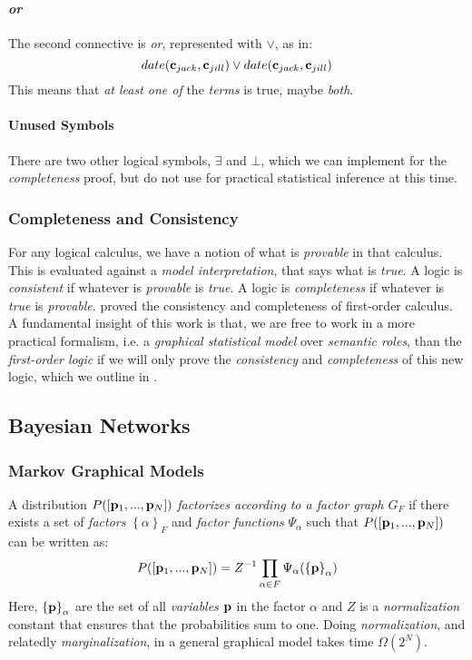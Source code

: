 \documentclass[11pt]{article}
\newcommand{\constant}[1]{{\bf c}_{#1}}
\newcommand{\pvariable}{{\bf p}}
\newcommand{\opor}{\textbf{\em or}}
\begin{document}
\paragraph{\opor}
The second connective is {\em or}, represented with $\vee$, as in:
\begin{equation} date(\constant{jack}, \constant{jill}) \vee date(\constant{jack}, \constant{jill}) \end{equation}
This means that {\em at least one of} the {\em terms} is true, maybe {\em both}.

\paragraph{Unused Symbols}
There are two other logical symbols, $\exists$ and $\bot$, which we can implement for the {\em completeness} proof, but do not use for practical statistical inference at this time.

\subsubsection*{Completeness and Consistency}
For any logical calculus, we have a notion of what is {\em provable} in that calculus.
This is evaluated against a {\em model interpretation}, that says what is {\em true}.
A logic is {\em consistent} if whatever is {\em provable} is {\em true}.
A logic is {\em completeness} if whatever is {\em true} is {\em provable}.
\cite{Godel1930} proved the consistency and completeness of first-order calculus.
A fundamental insight of this work is that, we are free to work in a more practical formalism, i.e. a {\em graphical statistical model} over {\em semantic roles}, than the {\em first-order logic} if we will only prove the {\em consistency} and {\em completeness} of this new logic, which we outline in \cite{Coppola2024}.

\subsection{Bayesian Networks}
\subsubsection*{Markov Graphical Models}
A distribution \( P([\pvariable_1, ..., \pvariable_N]) \) \textit{factorizes according to a factor graph \( G_F \)} if there exists a set of {\em factors} $\left\{\alpha\right\}_F$ and {\em factor functions} \( \Psi_\alpha \) such that \( P([\pvariable_1, ..., \pvariable_N]) \) can be written as:
\begin{equation}
    P([\pvariable_1, ..., \pvariable_N]) = Z^{-1} \prod_{\alpha \in F} \Psi_\alpha(\left\{\pvariable\right\}_\alpha)
\end{equation}
Here, $\left\{\pvariable\right\}_\alpha$ are the set of all {\em variables} $\pvariable$ in the factor $\alpha$ and \( Z \) is a {\em normalization} constant that ensures that the probabilities sum to one.
Doing {\em normalization}, and relatedly {\em marginalization}, in a general graphical model takes time $\Omega(2^N)$.
\end{document}
